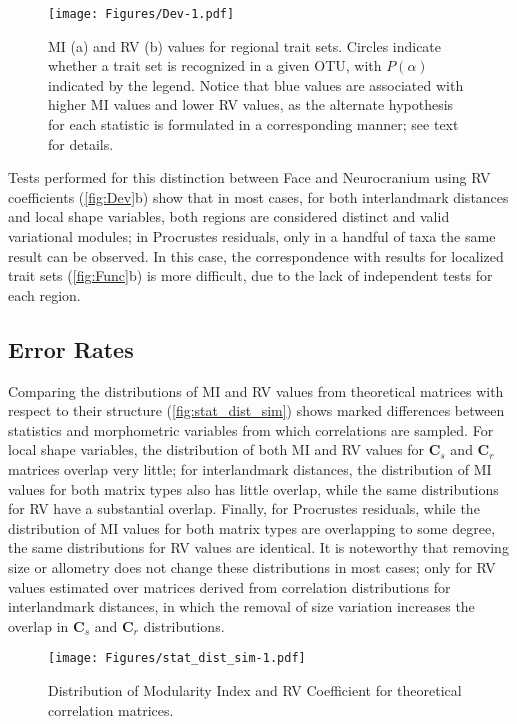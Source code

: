 \documentclass[12pt,]{article}
\begin{document}
\begin{figure}[htbp]
\centering
\texttt{[image: Figures/Dev-1.pdf]}
\caption{MI (a) and RV (b) values for regional trait sets. Circles
indicate whether a trait set is recognized in a given OTU, with
$P(\alpha)$ indicated by the legend. Notice that blue values are
associated with higher MI values and lower RV values, as the alternate
hypothesis for each statistic is formulated in a corresponding manner;
see text for details. \label{fig:Dev}}
\end{figure}

Tests performed for this distinction between Face and Neurocranium using
RV coefficients (\autoref{fig:Dev}b) show that in most cases, for both
interlandmark distances and local shape variables, both regions are
considered distinct and valid variational modules; in Procrustes
residuals, only in a handful of taxa the same result can be observed. In
this case, the correspondence with results for localized trait sets
(\autoref{fig:Func}b) is more difficult, due to the lack of independent
tests for each region.

\subsection{Error Rates}\label{error-rates}

Comparing the distributions of MI and RV values from theoretical
matrices with respect to their structure (\autoref{fig:stat_dist_sim})
shows marked differences between statistics and morphometric variables
from which correlations are sampled. For local shape variables, the
distribution of both MI and RV values for $\mathbf{C}_s$ and
$\mathbf{C}_r$ matrices overlap very little; for interlandmark
distances, the distribution of MI values for both matrix types also has
little overlap, while the same distributions for RV have a substantial
overlap. Finally, for Procrustes residuals, while the distribution of MI
values for both matrix types are overlapping to some degree, the same
distributions for RV values are identical. It is noteworthy that
removing size or allometry does not change these distributions in most
cases; only for RV values estimated over matrices derived from
correlation distributions for interlandmark distances, in which the
removal of size variation increases the overlap in $\mathbf{C}_s$ and
$\mathbf{C}_r$ distributions.

\begin{figure}[htbp]
\centering
\texttt{[image: Figures/stat\_dist\_sim-1.pdf]}
\caption{Distribution of Modularity Index and RV Coefficient for
theoretical correlation matrices. \label{fig:stat_dist_sim}}
\end{figure}
\end{document}
